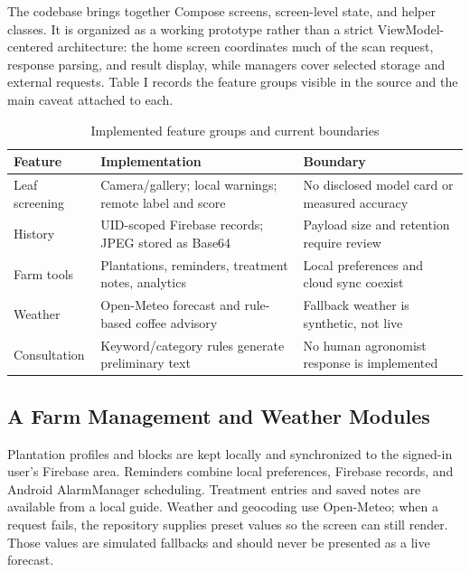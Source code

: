 \documentclass[conference]{IEEEtran}
\begin{document}
The codebase brings together Compose screens, screen-level state, and helper classes. It is organized as a working prototype rather than a strict ViewModel-centered architecture: the home screen coordinates much of the scan request, response parsing, and result display, while managers cover selected storage and external requests. Table I records the feature groups visible in the source and the main caveat attached to each.

\begin{table}[!t]
\caption{Implemented feature groups and current boundaries}
\label{tab:features}
\centering
\scriptsize
\begin{tabularx}{\columnwidth}{>{\raggedright\arraybackslash}p{}>{\raggedright\arraybackslash}X>{\raggedright\arraybackslash}X}
\toprule
\textbf{Feature} & \textbf{Implementation} & \textbf{Boundary} \\
\midrule
Leaf screening & Camera/gallery; local warnings; remote label and score & No disclosed model card or measured accuracy \\
History & UID-scoped Firebase records; JPEG stored as Base64 & Payload size and retention require review \\
Farm tools & Plantations, reminders, treatment notes, analytics & Local preferences and cloud sync coexist \\
Weather & Open-Meteo forecast and rule-based coffee advisory & Fallback weather is synthetic, not live \\
Consultation & Keyword/category rules generate preliminary text & No human agronomist response is implemented \\
\bottomrule
\end{tabularx}
\end{table}

\subsection*{A Farm Management and Weather Modules}

Plantation profiles and blocks are kept locally and synchronized to the signed-in user's Firebase area. Reminders combine local preferences, Firebase records, and Android AlarmManager scheduling. Treatment entries and saved notes are available from a local guide. Weather and geocoding use Open-Meteo; when a request fails, the repository supplies preset values so the screen can still render. Those values are simulated fallbacks and should never be presented as a live forecast.
\end{document}
